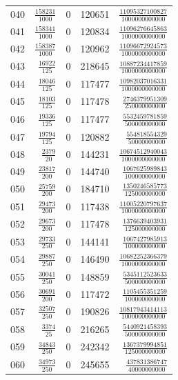 \begin{longtable}{@{}rrrrr@{}}
040 & $\frac{158231}{1000}$ & 0 & 120651 & $\frac{11095327100827}{1000000000000}$\\[3pt]
041 & $\frac{158341}{1000}$ & 0 & 120834 & $\frac{11096276645863}{1000000000000}$\\[3pt]
042 & $\frac{158387}{1000}$ & 0 & 120962 & $\frac{11096672924573}{1000000000000}$\\[3pt]
043 & $\frac{16922}{125}$ & 0 & 218645 & $\frac{10887234417859}{1000000000000}$\\[3pt]
044 & $\frac{18046}{125}$ & 0 & 117477 & $\frac{10982037016331}{1000000000000}$\\[3pt]
045 & $\frac{18103}{125}$ & 0 & 117478 & $\frac{2746379951309}{250000000000}$\\[3pt]
046 & $\frac{19336}{125}$ & 0 & 117477 & $\frac{5532459781859}{500000000000}$\\[3pt]
047 & $\frac{19794}{125}$ & 0 & 120882 & $\frac{554818554329}{50000000000}$\\[3pt]
048 & $\frac{2379}{20}$ & 0 & 144231 & $\frac{10674512940043}{1000000000000}$\\[3pt]
049 & $\frac{23817}{200}$ & 0 & 144740 & $\frac{1067625989843}{100000000000}$\\[3pt]
050 & $\frac{25759}{200}$ & 0 & 184710 & $\frac{1350246585773}{125000000000}$\\[3pt]
051 & $\frac{29473}{200}$ & 0 & 117438 & $\frac{11005220797637}{1000000000000}$\\[3pt]
052 & $\frac{29673}{200}$ & 0 & 117478 & $\frac{1376639403931}{125000000000}$\\[3pt]
053 & $\frac{29733}{250}$ & 0 & 144141 & $\frac{1067427985913}{100000000000}$\\[3pt]
054 & $\frac{29887}{250}$ & 0 & 146490 & $\frac{10682252366379}{1000000000000}$\\[3pt]
055 & $\frac{30041}{250}$ & 0 & 148859 & $\frac{5345112523633}{500000000000}$\\[3pt]
056 & $\frac{30691}{200}$ & 0 & 117472 & $\frac{1105455351259}{100000000000}$\\[3pt]
057 & $\frac{32507}{250}$ & 0 & 190826 & $\frac{10817943414113}{1000000000000}$\\[3pt]
058 & $\frac{3374}{25}$ & 0 & 216265 & $\frac{5440921458393}{500000000000}$\\[3pt]
059 & $\frac{34843}{250}$ & 0 & 242342 & $\frac{1367379994851}{125000000000}$\\[3pt]
060 & $\frac{34973}{250}$ & 0 & 245655 & $\frac{437831386747}{40000000000}$\\[3pt]

\end{longtable}
